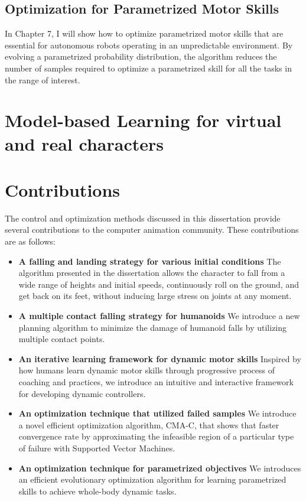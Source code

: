 \subsection{Optimization for Parametrized Motor Skills}
In Chapter 7, I will show how to optimize parametrized motor skills that are
essential for autonomous robots operating in an unpredictable environment. 
By evolving a parametrized probability distribution, the algorithm reduces 
the number of samples required to optimize a parametrized skill for 
all the tasks in the range of interest. 

\section{Model-based Learning for virtual and real characters}

\section{Contributions}
The control and optimization methods discussed in this dissertation provide
several contributions to the computer animation community. 
These contributions are as follows:


\begin{itemize}
\item \textbf{A falling and landing strategy for various initial conditions}
  The algorithm presented in the dissertation allows the character to fall from 
  a wide range of heights and initial speeds, continuously roll on the ground, 
  and get back on its feet, without inducing large stress on joints at any
  moment.
\item \textbf{A multiple contact falling strategy for humanoids}
  We introduce a new planning algorithm to minimize the damage of humanoid 
  falls by utilizing multiple contact points. 
\item \textbf{An iterative learning framework for dynamic motor skills}
  Inspired by how humans learn dynamic motor skills through progressive process 
  of coaching and practices, we introduce an intuitive and interactive 
  framework for developing dynamic controllers. 
\item \textbf{An optimization technique that utilized failed samples}
  We introduce a novel efficient optimization algorithm, CMA-C, that shows 
  that faster convergence rate by approximating the infeasible region of a  
  particular type of failure with Supported Vector Machines.
\item \textbf{An optimization technique for parametrized objectives}
  We introduces an efficient evolutionary optimization algorithm for learning
  parametrized skills to achieve whole-body dynamic tasks. 
\end{itemize}

